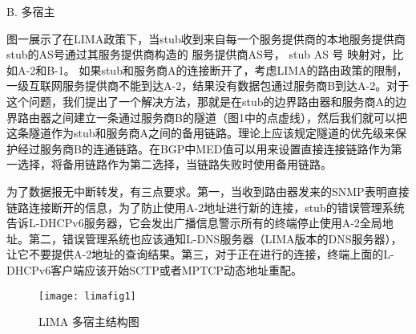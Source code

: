 \begin{flushleft}
B.	多宿主
\end{flushleft}
\par 图一展示了在LIMA政策下，当stub收到来自每一个服务提供商的本地服务提供商stub的AS号通过其服务提供商构造的{ 服务提供商AS号， stub AS 号 } 映射对，比如A-2和B-1。 如果stub和服务商A的连接断开了，考虑LIMA的路由政策的限制，一级互联网服务提供商不能到达A-2，结果没有数据包通过服务商B到达A-2。对于这个问题，我们提出了一个解决方法，那就是在stub的边界路由器和服务商A的边界路由器之间建立一条通过服务商B的隧道（图1中的点虚线），然后我们就可以把这条隧道作为stub和服务商A之间的备用链路。理论上应该规定隧道的优先级来保护经过服务商B的连通链路。在BGP中MED值可以用来设置直接连接链路作为第一选择，将备用链路作为第二选择，当链路失败时使用备用链路。
\par 为了数据报无中断转发，有三点要求。第一，当收到路由器发来的SNMP表明直接链路连接断开的信息，为了防止使用A-2地址进行新的连接，stub的错误管理系统告诉L-DHCPv6服务器，它会发出广播信息警示所有的终端停止使用A-2全局地址。第二，错误管理系统也应该通知L-DNS服务器（LIMA版本的DNS服务器），让它不要提供A-2地址的查询结果。第三，对于正在进行的连接，终端上面的L-DHCPv6客户端应该开始SCTP或者MPTCP动态地址重配。

\begin{figure}
  \centering
  \texttt{[image: limafig1]}\\
  \caption{LIMA 多宿主结构图}\label{fig:limafig1}
\end{figure}

